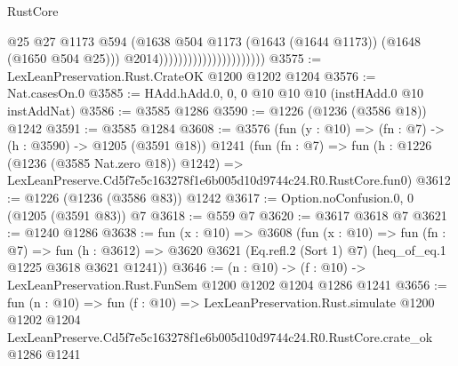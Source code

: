\begin{lexlean}{RustCore}
\begin{coremodule}
                                                @25
                                                @27
                                                @1173
                                                @594
                                                (@1638
                                                  @504
                                                  @1173
                                                  (@1643 (@1644 @1173))
                                                  (@1648 (@1650 @504 @25)))
                                                @2014))))))))))))))))))))))
@3575 := LexLeanPreservation.Rust.CrateOK @1200 @1202 @1204
@3576 := Nat.casesOn.{0}
@3585 := HAdd.hAdd.{0, 0, 0} @10 @10 @10 (instHAdd.{0} @10 instAddNat)
@3586 := @3585 @1286
@3590 := @1226 (@1236 (@3586 @18)) @1242
@3591 := @3585 @1284
@3608 := @3576
    (fun (y : @10) => (fn : @7) -> (h : @3590) -> @1205 (@3591 @18))
    @1241
    (fun (fn : @7) =>
    fun (h : @1226 (@1236 (@3585 Nat.zero @18)) @1242) =>
    LexLeanPreserve.Cd5f7e5c163278f1e6b005d10d9744c24.R0.RustCore.fun0)
@3612 := @1226 (@1236 (@3586 @83)) @1242
@3617 := Option.noConfusion.{0, 0} (@1205 (@3591 @83)) @7
@3618 := @559 @7
@3620 := @3617 @3618 @7
@3621 := @1240 @1286
@3638 := fun (x : @10) =>
  @3608
    (fun (x : @10) =>
    fun (fn : @7) =>
    fun (h : @3612) =>
    @3620 @3621 (Eq.refl.{2} (Sort 1) @7) (heq_of_eq.{1} @1225 @3618 @3621 @1241))
@3646 := (n : @10) -> (f : @10) -> LexLeanPreservation.Rust.FunSem @1200 @1202 @1204 @1286 @1241
@3656 := fun (n : @10) =>
  fun (f : @10) =>
  LexLeanPreservation.Rust.simulate
    @1200
    @1202
    @1204
    LexLeanPreserve.Cd5f7e5c163278f1e6b005d10d9744c24.R0.RustCore.crate_ok
    @1286
    @1241
\end{coremodule}
\end{lexlean}
